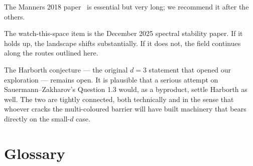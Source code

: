 \documentclass[11pt,a4paper]{article}
\theoremstyle{plain}
\theoremstyle{definition}
\theoremstyle{remark}
\begin{document}
The Manners 2018 paper~\cite{manners2018} is essential but very long; we recommend it after the others.

The watch-this-space item is the December 2025 spectral stability paper. If it holds up, the landscape shifts substantially. If it does not, the field continues along the routes outlined here.

The Harborth conjecture --- the original $d = 3$ statement that opened our exploration --- remains open. It is plausible that a serious attempt on Sauermann--Zakharov's Question 1.3 would, as a byproduct, settle Harborth as well. The two are tightly connected, both technically and in the sense that whoever cracks the multi-coloured barrier will have built machinery that bears directly on the small-$d$ case.

\newpage

\appendix

\section{Glossary}
\end{document}
